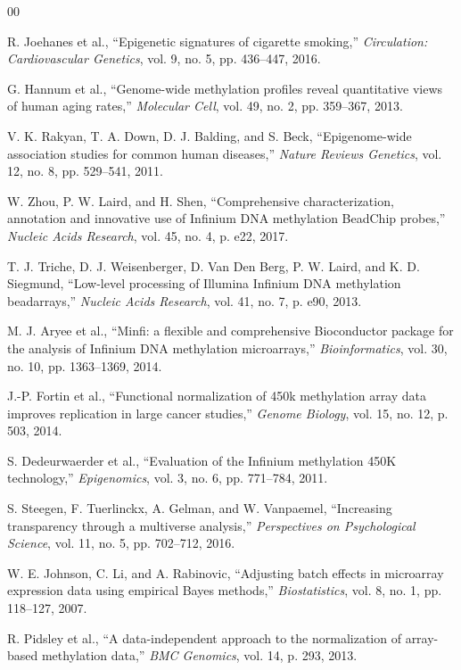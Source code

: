\documentclass[conference]{IEEEtran}
\begin{document}
\begin{thebibliography}{00}

R. Joehanes et al., ``Epigenetic signatures of cigarette smoking,'' \textit{Circulation: Cardiovascular Genetics}, vol. 9, no. 5, pp. 436--447, 2016.

G. Hannum et al., ``Genome-wide methylation profiles reveal quantitative views of human aging rates,'' \textit{Molecular Cell}, vol. 49, no. 2, pp. 359--367, 2013.

V. K. Rakyan, T. A. Down, D. J. Balding, and S. Beck, ``Epigenome-wide association studies for common human diseases,'' \textit{Nature Reviews Genetics}, vol. 12, no. 8, pp. 529--541, 2011.

W. Zhou, P. W. Laird, and H. Shen, ``Comprehensive characterization, annotation and innovative use of Infinium DNA methylation BeadChip probes,'' \textit{Nucleic Acids Research}, vol. 45, no. 4, p. e22, 2017.

T. J. Triche, D. J. Weisenberger, D. Van Den Berg, P. W. Laird, and K. D. Siegmund, ``Low-level processing of Illumina Infinium DNA methylation beadarrays,'' \textit{Nucleic Acids Research}, vol. 41, no. 7, p. e90, 2013.

M. J. Aryee et al., ``Minfi: a flexible and comprehensive Bioconductor package for the analysis of Infinium DNA methylation microarrays,'' \textit{Bioinformatics}, vol. 30, no. 10, pp. 1363--1369, 2014.

J.-P. Fortin et al., ``Functional normalization of 450k methylation array data improves replication in large cancer studies,'' \textit{Genome Biology}, vol. 15, no. 12, p. 503, 2014.

S. Dedeurwaerder et al., ``Evaluation of the Infinium methylation 450K technology,'' \textit{Epigenomics}, vol. 3, no. 6, pp. 771--784, 2011.

S. Steegen, F. Tuerlinckx, A. Gelman, and W. Vanpaemel, ``Increasing transparency through a multiverse analysis,'' \textit{Perspectives on Psychological Science}, vol. 11, no. 5, pp. 702--712, 2016.

W. E. Johnson, C. Li, and A. Rabinovic, ``Adjusting batch effects in microarray expression data using empirical Bayes methods,'' \textit{Biostatistics}, vol. 8, no. 1, pp. 118--127, 2007.

R. Pidsley et al., ``A data-independent approach to the normalization of array-based methylation data,'' \textit{BMC Genomics}, vol. 14, p. 293, 2013.


\end{thebibliography}
\end{document}
